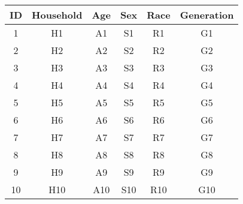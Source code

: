 \begin{tabular}{cccccc}
ID & Household & Age & Sex & Race & Generation \\
\hline
\hline
1 & H1 & A1 & S1 & R1 & G1  \\
\hline
2 & H2 & A2 & S2 & R2 & G2  \\
\hline
3 & H3 & A3 & S3 & R3 & G3  \\
\hline
4 & H4 & A4 & S4 & R4 & G4  \\
\hline
5 & H5 & A5 & S5 & R5 & G5  \\
\hline
6 & H6 & A6 & S6 & R6 & G6  \\
\hline
7 & H7 & A7 & S7 & R7 & G7  \\
\hline
8 & H8 & A8 & S8 & R8 & G8  \\
\hline
9 & H9 & A9 & S9 & R9 & G9  \\
\hline
10 & H10 & A10 & S10 & R10 & G10  \\
\hline
\end{tabular}
